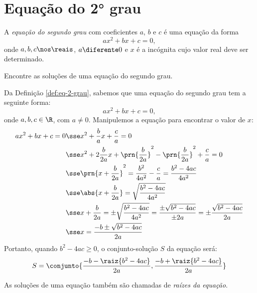 \section{Equação do 2° grau}

\begin{definition}
	\label{def:eq-2-grau}
	A \emph{equação do segundo grau} com coeficientes $a$, $b$ e $c$ é uma equação da forma 
	\[
		ax^2 + bx + c = 0,
	\]
	onde $a, b, c \nos \reais$, $a \diferente 0$ e $x$ é a incógnita cujo valor real deve ser determinado.
\end{definition}

\begin{example}
	\label{ex:sol-2-grau}
	Encontre as soluções de uma equação do segundo grau.
\end{example}

\begin{solution}
	Da Definição \ref{def:eq-2-grau}, sabemos que uma equação do segundo grau tem a seguinte forma:
	\[
		ax^2 + bx + c = 0,
	\]
	onde $a,b,c \in \R$, com $a \ne 0$. Manipulemos a equação para encontrar o valor de $x$:
	\begin{align*}
		ax^2 + bx + c = 0 & \sse x^2+\frac{b}{a}x +\frac{c}{a}=0 \\ 
						  & \sse x^2+2\frac{b}{2a}x+\prn{\frac{b}{2a}}^2-\prn{\frac{b}{2a}}^2+\frac{c}{a}=0\\ 
						  & \sse \prn{x+\frac{b}{2a}}^2=\frac{b^2}{4a^2}-\frac{c}{a}=\frac{b^2 -4ac}{4a^2}\\ 
						  & \sse \abs{x+\frac{b}{2a}} = \sqrt{\frac{b^2-4ac}{4a^2}}\\ 
						  & \sse x+\frac{b}{2a}=\pm\sqrt{\frac{b^2-4ac}{4a^2}}=\frac{\pm\sqrt{b^2-4ac}}{\pm2a}=\pm\frac{\sqrt{b^2-4ac}}{2a}\\ 
						  & \sse x=\frac{-b\pm\sqrt{b^2-4ac}}{2a}\\ 
	\end{align*}
	Portanto, quando $b^2-4ac \ge 0$, o conjunto-solução $S$ da equação será:
	\begin{align*}
		S = \conjunto{\dfrac {-b - \raiz{b^2 - 4ac}} {2a}, \dfrac{-b + \raiz{b^2 - 4ac}} {2a}}
	\end{align*}
\end{solution}

\begin{remark}
	As soluções de uma equação também são chamadas de \emph{raízes da equação}.
\end{remark}

\begin{tve}
\end{tve}

